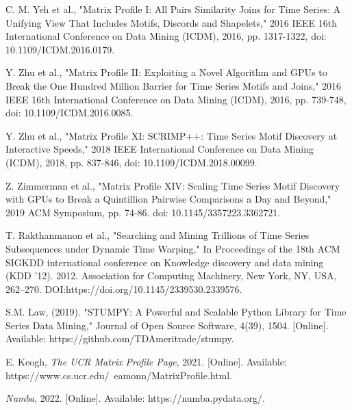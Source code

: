 \documentclass[conference]{IEEEtran}
\begin{document}
\begin{thebibliography}{8}  

 C. M. Yeh et al., "Matrix Profile I: All Pairs Similarity Joins for Time Series: A Unifying View That Includes Motifs, Discords and Shapelets," 2016 IEEE 16th International Conference on Data Mining (ICDM), 2016, pp. 1317-1322, doi: 10.1109/ICDM.2016.0179.

 Y. Zhu et al., "Matrix Profile II: Exploiting a Novel Algorithm and GPUs to Break the One Hundred Million Barrier for Time Series Motifs and Joins," 2016 IEEE 16th International Conference on Data Mining (ICDM), 2016, pp. 739-748, doi: 10.1109/ICDM.2016.0085.

 Y. Zhu et al., "Matrix Profile XI: SCRIMP++: Time Series Motif Discovery at Interactive Speeds," 2018 IEEE International Conference on Data Mining (ICDM), 2018, pp. 837-846, doi: 10.1109/ICDM.2018.00099.

 Z. Zimmerman et al., "Matrix Profile XIV: Scaling Time Series Motif Discovery with GPUs to Break a Quintillion Pairwise Comparisons a Day and Beyond," 2019 ACM Symposium, pp. 74-86. doi: 10.1145/3357223.3362721. 

 T. Rakthanmanon et al., "Searching and Mining Trillions of Time Series Subsequences under Dynamic Time Warping," In Proceedings of the 18th ACM SIGKDD international conference on Knowledge discovery and data mining (KDD '12). 2012. Association for Computing Machinery, New York, NY, USA, 262–270. DOI:https://doi.org/10.1145/2339530.2339576.

 S.M. Law, (2019). "STUMPY: A Powerful and Scalable Python Library for Time Series Data Mining," Journal of Open Source Software, 4(39), 1504. [Online]. Available: https://github.com/TDAmeritrade/stumpy.

 E. Keogh, \emph{The UCR Matrix Profile Page}, 2021. [Online]. Available: https://www.cs.ucr.edu/~eamonn/MatrixProfile.html.

 \emph{Numba}, 2022. [Online]. Available: https://numba.pydata.org/.

\end{thebibliography}
\end{document}
